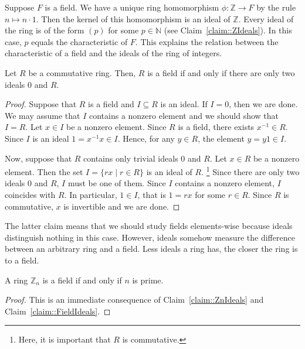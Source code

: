\begin{remark}
Suppose $F$ is a field.
We have a unique ring homomorphism $\phi\colon \mathbb Z\to F$ by the rule $n \mapsto n \cdot 1$.
Then the kernel of this homomorphism is an ideal of $\mathbb Z$.
Every ideal of the ring is of the form $(p)$ for some $p\in \mathbb N$ (see Claim~\ref{claim::ZIdeals}).
In this case, $p$ equals the characteristic of $F$.
This explains the relation between the characteristic of a field and the ideals of the ring of integers.
\end{remark}

\begin{claim}
\label{claim::FieldIdeals}
Let $R$ be a commutative ring.
Then, $R$ is a field if and only if there are only two ideals $0$ and $R$.
\end{claim}
\begin{proof}
Suppose that $R$ is a field and $I\subseteq R$ is an ideal.
If $I = 0$, then we are done.
We may assume that $I$ contains a nonzero element and we should show that $I = R$.
Let $x\in I$ be a nonzero element.
Since $R$ is a field, there exists $x^{-1}\in R$.
Since $I$ is an ideal $1 =x^{-1}x\in I$.
Hence, for any $y\in R$, the element $y = y 1 \in I$.

Now, suppose that $R$ contains only trivial ideals $0$ and $R$.
Let $x\in R$ be a nonzero element.
Then the set $I = \{rx \mid r\in R\}$ is an ideal of $R$.%
\footnote{Here, it is important that $R$ is commutative.}
Since there are only two ideals $0$ and $R$, $I$ must be one of them.
Since $I$ contains a nonzero element, $I$ coincides with $R$.
In particular, $1\in I$, that is $1 = rx$ for some $r\in R$.
Since $R$ is commutative, $x$ is invertible and we are done.
\end{proof}

The latter claim means that we should study fields elements-wise because ideals distinguish nothing in this case.
However, ideals somehow measure the difference between an arbitrary ring and a field.
Less ideals a ring has, the closer the ring is to a field.

\begin{claim}
\label{claim::ZpField}
A ring $\mathbb Z_n$ is a field if and only if $n$ is prime.
\end{claim}
\begin{proof}
This is an immediate consequence of Claim~\ref{claim::ZnIdeals} and Claim~\ref{claim::FieldIdeals}.
\end{proof}


